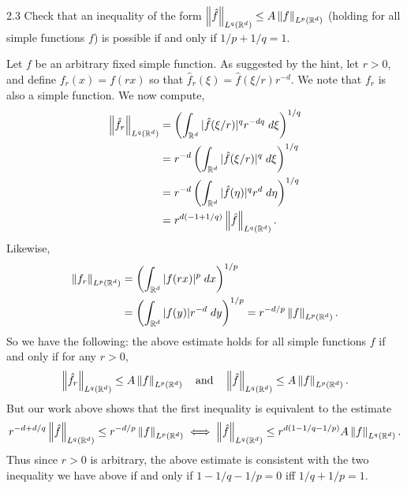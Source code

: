 \documentclass{article}
\begin{document}
\begin{prb}{2.3}
	Check that an inequality of the form $\left\Vert \hat{f} \right\Vert_{L^{q}(\mathbb{R}^{d})} \leq A \left\Vert f \right\Vert_{L^{p}(\mathbb{R}^{d})}$ (holding for all simple functions $f$) is possible if and only if $1/p + 1/q = 1$. \newline [Hint: Let $f_{r}(x) = f(rx)$, $r > 0$. Then $\hat{f}_{r}(\xi) = \hat{f}(\xi/r)r^{-d}$.]
\end{prb}
Let $f$ be an arbitrary fixed simple function. As suggested by the hint, let $r > 0$, and define $f_{r}(x) = f(rx)$ so that $\hat{f}_{r}(\xi) = \hat{f}(\xi/r)r^{-d}$. We note that $f_{r}$ is also a simple function. We now compute, 
\begin{align*}
	\begin{split}
		\left\Vert \hat{f}_{r} \right\Vert_{L^{q}(\mathbb{R}^{d})} &= \left(\int_{\mathbb{R}^{d}}|\hat{f}(\xi/r)|^{q}r^{-dq}\;d\xi\right)^{1/q} \\
		&= r^{-d}\left(\int_{\mathbb{R}^{d}}|\hat{f}(\xi/r)|^{q}\;d\xi\right)^{1/q} \\
		&= r^{-d}\left(\int_{\mathbb{R}^{d}}|\hat{f}(\eta)|^{q}r^{d}\;d\eta\right)^{1/q} \\
		&= r^{d(-1 + 1/q)}\left\Vert \hat{f} \right\Vert_{L^{q}(\mathbb{R}^{d})}. 
	\end{split} 
\end{align*}
Likewise, 
\begin{align*}
	\begin{split}
		\left\Vert f_{r} \right\Vert_{L^{p}(\mathbb{R}^{d})} &= \left(\int_{\mathbb{R}^{d}}|f(rx)|^{p}\;dx\right)^{1/p} \\
		&= \left(\int_{\mathbb{R}^{d}}|f(y)|r^{-d}\;dy\right)^{1/p} = r^{-d/p}\left\Vert f \right\Vert_{L^{p}(\mathbb{R}^{d})}. 
	\end{split} 
\end{align*}
So we have the following: the above estimate holds for all simple functions $f$ if and only if for any $r > 0$, 
\begin{equation*}
	\left\Vert \hat{f}_{r} \right\Vert_{L^{q}(\mathbb{R}^{d})} \leq A \left\Vert f \right\Vert_{L^{p}(\mathbb{R}^{d})} \quad \text{and} \quad \left\Vert \hat{f} \right\Vert_{L^{q}(\mathbb{R}^{d})} \leq A\left\Vert f \right\Vert_{L^{p}(\mathbb{R}^{d})}. 
\end{equation*} 
But our work above shows that the first inequality is equivalent to the estimate 
\begin{equation*}
	r^{-d + d/q}\left\Vert \hat{f} \right\Vert_{L^{q}(\mathbb{R}^{d})} \leq r^{-d/p}\left\Vert f \right\Vert_{L^{p}(\mathbb{R}^{d})} \iff \left\Vert \hat{f} \right\Vert_{L^{q}(\mathbb{R}^{d})} \leq r^{d(1 - 1/q - 1/p)}A\left\Vert f \right\Vert_{L^{q}(\mathbb{R}^{d})}. 
\end{equation*}
Thus since $r > 0$ is arbitrary, the above estimate is consistent with the two inequality we have above if and only if $1 - 1/q - 1/p = 0$ iff $1/q + 1/p = 1$. 
\end{document}
